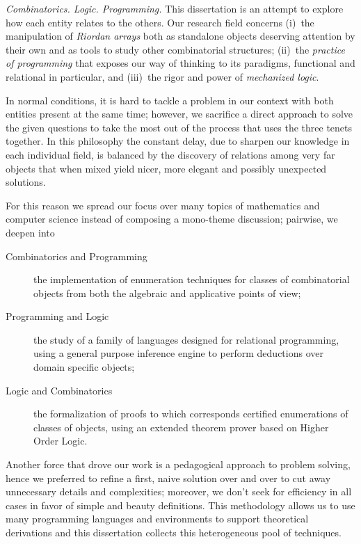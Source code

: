 


\textit{Combinatorics. Logic. Programming.} This dissertation is an attempt to
explore how each entity relates to the others. Our research field concerns
(i)~the manipulation of \textit{Riordan arrays} both as standalone objects
deserving attention by their own and as tools to study other combinatorial
structures; (ii)~the \textit{practice of programming} that exposes our way of 
thinking to its paradigms, functional and relational in particular, and 
(iii)~the rigor and power of \textit{mechanized logic}.

In normal conditions, it is hard to tackle a problem in our context with both
entities present at the same time; however, we sacrifice a direct approach to
solve the given questions to take the most out of the process that uses the
three tenets together. In this philosophy the constant delay, due to sharpen
our knowledge in each individual field, is balanced by the discovery of
relations among very far objects that when mixed yield nicer, more elegant and
possibly unexpected solutions.

For this reason we spread our focus over many topics of mathematics and
computer science instead of composing a mono-theme discussion; pairwise,
we deepen into
\begin{description}

    \item[Combinatorics and Programming] the implementation of enumeration
    techniques for classes of combinatorial objects from both the algebraic
    and applicative points of view;

    \item[Programming and Logic] the study of a family of languages designed
    for relational programming, using a general purpose inference engine to 
    perform deductions over domain specific objects;

    \item[Logic and Combinatorics] the formalization of proofs to which
    corresponds certified enumerations of classes of objects, using an extended
    theorem prover based on Higher Order Logic.

\end{description}

Another force that drove our work is a pedagogical approach to problem solving,
hence we preferred to refine a first, naive solution over and over to cut away
unnecessary details and complexities; moreover, we don't seek for efficiency in
all cases in favor of simple and beauty definitions. This methodology allows us
to use many programming languages and environments to support theoretical
derivations and this dissertation collects this heterogeneous pool of techniques.


